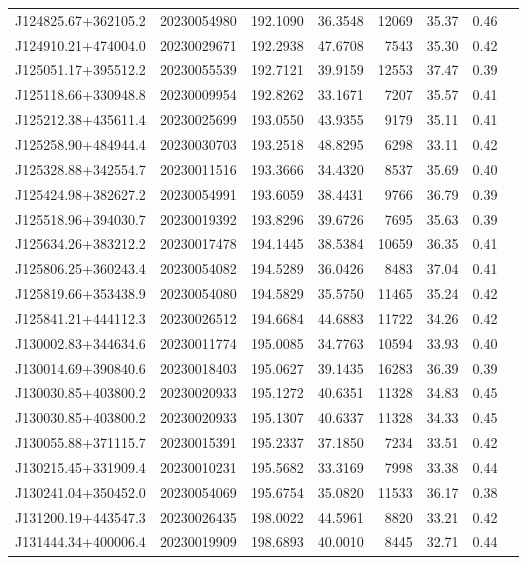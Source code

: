 \documentclass{article}
\begin{document}
\begin {longtable}{|l|l|r|r|r|r|r|l|}
 J124825.67+362105.2&  20230054980&  192.1090&   36.3548& 12069& 35.37& 0.46&\\
 J124910.21+474004.0&  20230029671&  192.2938&   47.6708&  7543& 35.30& 0.42&\\
 J125051.17+395512.2&  20230055539&  192.7121&   39.9159& 12553& 37.47& 0.39&\\
 J125118.66+330948.8&  20230009954&  192.8262&   33.1671&  7207& 35.57& 0.41&\\
 J125212.38+435611.4&  20230025699&  193.0550&   43.9355&  9179& 35.11& 0.41&\\
 J125258.90+484944.4&  20230030703&  193.2518&   48.8295&  6298& 33.11& 0.42&\\
 J125328.88+342554.7&  20230011516&  193.3666&   34.4320&  8537& 35.69& 0.40&\\
 J125424.98+382627.2&  20230054991&  193.6059&   38.4431&  9766& 36.79& 0.39&\\
 J125518.96+394030.7&  20230019392&  193.8296&   39.6726&  7695& 35.63& 0.39&\\
 J125634.26+383212.2&  20230017478&  194.1445&   38.5384& 10659& 36.35& 0.41&\\
 J125806.25+360243.4&  20230054082&  194.5289&   36.0426&  8483& 37.04& 0.41&\\
 J125819.66+353438.9&  20230054080&  194.5829&   35.5750& 11465& 35.24& 0.42&\\
 J125841.21+444112.3&  20230026512&  194.6684&   44.6883& 11722& 34.26& 0.42&\\
 J130002.83+344634.6&  20230011774&  195.0085&   34.7763& 10594& 33.93& 0.40&\\
 J130014.69+390840.6&  20230018403&  195.0627&   39.1435& 16283& 36.39& 0.39&\\
 J130030.85+403800.2&  20230020933&  195.1272&   40.6351& 11328& 34.83& 0.45&\\
 J130030.85+403800.2&  20230020933&  195.1307&   40.6337& 11328& 34.33& 0.45&\\
 J130055.88+371115.7&  20230015391&  195.2337&   37.1850&  7234& 33.51& 0.42&\\
 J130215.45+331909.4&  20230010231&  195.5682&   33.3169&  7998& 33.38& 0.44&\\
 J130241.04+350452.0&  20230054069&  195.6754&   35.0820& 11533& 36.17& 0.38&\\
 J131200.19+443547.3&  20230026435&  198.0022&   44.5961&  8820& 33.21& 0.42&\\
 J131444.34+400006.4&  20230019909&  198.6893&   40.0010&  8445& 32.71& 0.44&\\

\end{longtable}
\end{document}
